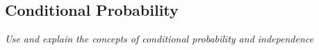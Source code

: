 \subsection[conditional probability]{Conditional Probability}

\textit{Use and explain the concepts of conditional probability and independence}